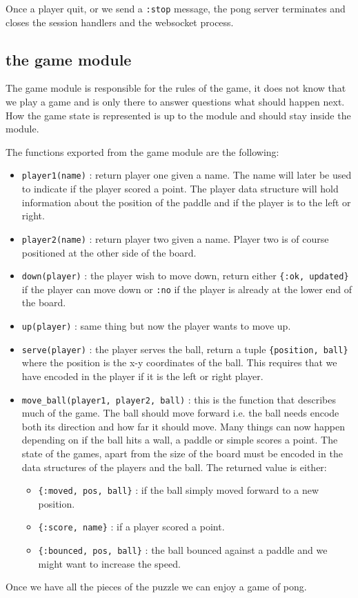 \documentclass[a4paper,11pt]{article}
\begin{document}
Once a player quit, or we send a {\tt :stop} message, the pong server
terminates and closes the session handlers and the websocket process.


\subsection*{the game module}

The game module is responsible for the rules of the game, it does not
know that we play a game and is only there to answer questions what
should happen next. How the game state is represented is up to the
module and should stay inside the module.

The functions exported from the game module are the following:

\begin{itemize}
\item {\tt player1(name)} : return player one given a name. The name
  will later be used to indicate if the player scored a point. The
  player data structure will hold information about the position of
  the paddle and if the player is to the left or right.

\item {\tt player2(name)} : return player two given a name. Player two is 
  of course positioned at the other side of the board.

\item {\tt down(player)} : the player wish to move down, return either
  {\tt \{:ok, updated\}} if the player can move down or {\tt :no} if
  the player is already at the lower end of the board.

\item {\tt up(player)} : same thing but now the player wants to move up.

\item {\tt serve(player)} : the player serves the ball, return a tuple
{\tt \{position, ball\}} where the position is the x-y coordinates of
the ball. This requires that we have encoded in the player if it is
the left or right player.

\item {\tt move_ball(player1, player2, ball)} : this is the function
  that describes much of the game. The ball should move forward
  i.e. the ball needs encode both its direction and how far it should
  move. Many things can now happen depending on if the ball hits a
  wall, a paddle or simple scores a point. The state of the games,
  apart from the size of the board must be encoded in the data
  structures of the players and the ball. The returned value is
  either:

  \begin{itemize}
  \item {\tt \{:moved, pos, ball\}} : if the ball simply moved forward to a new position.
  \item {\tt \{:score, name\}} : if a player scored a point.
  \item {\tt \{:bounced, pos, ball\}} : the ball bounced against a
    paddle and we might want to increase the speed.
  \end{itemize}

\end{itemize}

Once we have all the pieces of the puzzle we can enjoy a game of pong. 
\end{document}
